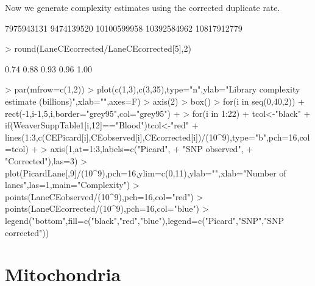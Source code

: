 \documentclass{article}
\begin{document}
Now we generate complexity estimates using the corrected duplicate rate.

\begin{Schunk}
\begin{Soutput}
[1]  7975943131  9474139520 10100599958 10392584962 10817912779
\end{Soutput}
\begin{Sinput}
> round(LaneCEcorrected/LaneCEcorrected[5],2)
\end{Sinput}
\begin{Soutput}
[1] 0.74 0.88 0.93 0.96 1.00
\end{Soutput}
\end{Schunk}



\begin{Schunk}
\begin{Sinput}
> par(mfrow=c(1,2))
> plot(c(1,3),c(3,35),type="n",ylab="Library complexity estimate (billions)",xlab="",axes=F)
> axis(2)
> box()
> for(i in seq(0,40,2)){
+   rect(-1,i-1,5,i,border="grey95",col="grey95")
+ }
> for(i in 1:22){
+   tcol<-"black"
+   if(WeaverSuppTable1[i,12]=="Blood"){tcol<-"red"}
+   lines(1:3,c(CEPicard[i],CEobserved[i],CEcorrected[i])/(10^9),type="b",pch=16,col=tcol)
+ }
> axis(1,at=1:3,labels=c("Picard",
+                        "SNP observed",
+                        "Corrected"),las=3)
> plot(PicardLane[,9]/(10^9),pch=16,ylim=c(0,11),ylab="",xlab="Number of lanes",las=1,main="Complexity")
> points(LaneCEobserved/(10^9),pch=16,col="red")
> points(LaneCEcorrected/(10^9),pch=16,col="blue")
> legend("bottom",fill=c("black","red","blue"),legend=c("Picard","SNP\nobserved","SNP corrected"))
\end{Sinput}
\end{Schunk}


\clearpage{}


\section{Mitochondria}
\end{document}
